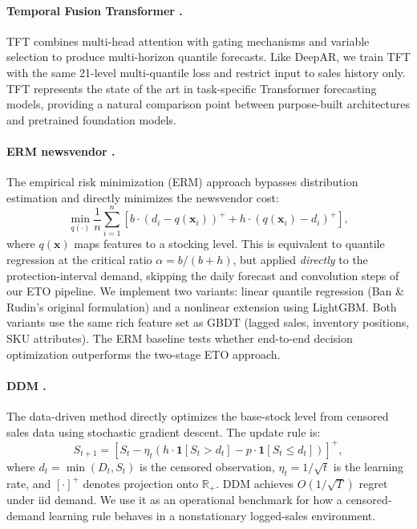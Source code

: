 \documentclass[msom,dblanonrev]{informs4}
\newcommand{\ind}{\mathbf{1}}
\newcommand{\R}{\mathbb{R}}
\begin{document}
\paragraph{Temporal Fusion Transformer \citep[TFT;][]{LimEtAl2021}.}
TFT combines multi-head attention with gating mechanisms and variable selection to produce multi-horizon quantile forecasts.
Like DeepAR, we train TFT with the same 21-level multi-quantile loss and restrict input to sales history only.
TFT represents the state of the art in task-specific Transformer forecasting models, providing a natural comparison point between purpose-built architectures and pretrained foundation models.

\paragraph{ERM newsvendor \citep{BanRudin2019}.}
The empirical risk minimization (ERM) approach bypasses distribution estimation and directly minimizes the newsvendor cost:
\begin{equation}\label{eq:erm}
  \min_{q(\cdot)} \frac{1}{n} \sum_{i=1}^{n} \left[b \cdot (d_i - q(\mathbf{x}_i))^+ + h \cdot (q(\mathbf{x}_i) - d_i)^+\right],
\end{equation}
where $q(\mathbf{x})$ maps features to a stocking level.
This is equivalent to quantile regression at the critical ratio $\alpha = b/(b+h)$, but applied \emph{directly} to the protection-interval demand, skipping the daily forecast and convolution steps of our ETO pipeline.
We implement two variants: linear quantile regression (Ban \& Rudin's original formulation) and a nonlinear extension using LightGBM.
Both variants use the same rich feature set as GBDT (lagged sales, inventory positions, SKU attributes).
The ERM baseline tests whether end-to-end decision optimization outperforms the two-stage ETO approach.

\paragraph{DDM \citep{ShiChenDuenyas2016}.}
The data-driven method directly optimizes the base-stock level from censored sales data using stochastic gradient descent.
The update rule is:
\begin{equation}\label{eq:ddm}
  S_{t+1} = \left[S_t - \eta_t \left(h \cdot \ind[S_t > d_t] - p \cdot \ind[S_t \leq d_t]\right)\right]^+,
\end{equation}
where $d_t = \min(D_t, S_t)$ is the censored observation, $\eta_t = 1/\sqrt{t}$ is the learning rate, and $[\cdot]^+$ denotes projection onto $\R_+$.
DDM achieves $O(1/\sqrt{T})$ regret under iid demand.
We use it as an operational benchmark for how a censored-demand learning rule behaves in a nonstationary logged-sales environment.
\end{document}

